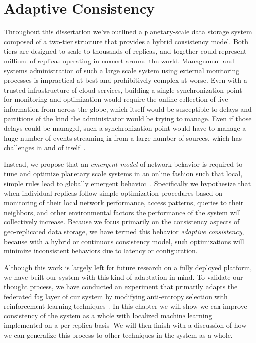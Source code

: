 
\renewcommand{\thechapter}{6}

\chapter{Adaptive Consistency}
\label{ch:adaptive_consistency}

Throughout this dissertation we've outlined a planetary-scale data storage system composed of a two-tier structure that provides a hybrid consistency model.
Both tiers are designed to scale to thousands of replicas, and together could represent millions of replicas operating in concert around the world.
Management and systems administration of such a large scale system using external monitoring processes is impractical at best and prohibitively complex at worse.
Even with a trusted infrastructure of cloud services, building a single synchronization point for monitoring and optimization would require the online collection of live information from across the globe, which itself would be susceptible to delays and partitions of the kind the administrator would be trying to manage.
Even if those delays could be managed, such a synchronization point would have to manage a huge number of events streaming in from a large number of sources, which has challenges in and of itself~\cite{spark_streaming}.

Instead, we propose that an \emph{emergent model} of network behavior is required to tune and optimize planetary scale systems in an online fashion such that local, simple rules lead to globally emergent behavior~\cite{bengfort_evolutionary_2014}.
Specifically we hypothesize that when individual replicas follow simple optimization procedures based on monitoring of their local network performance, access patterns, queries to their neighbors, and other environmental factors the performance of the system will collectively increase.
Because we focus primarily on the consistency aspects of geo-replicated data storage, we have termed this behavior \emph{adaptive consistency}, because with a hybrid or continuous consistency model, such optimizations will minimize inconsistent behaviors due to latency or configuration.

Although this work is largely left for future research on a fully deployed platform, we have built our system with this kind of adaptation in mind.
To validate our thought process, we have conducted an experiment that primarily adapts the federated fog layer of our system by modifying anti-entropy selection with reinforcement learning techniques~\cite{bengfort_anti-entropy_2018}.
In this chapter we will show we can improve consistency of the system as a whole with localized machine learning implemented on a per-replica basis.
We will then finish with a discussion of how we can generalize this process to other techniques in the system as a whole.

